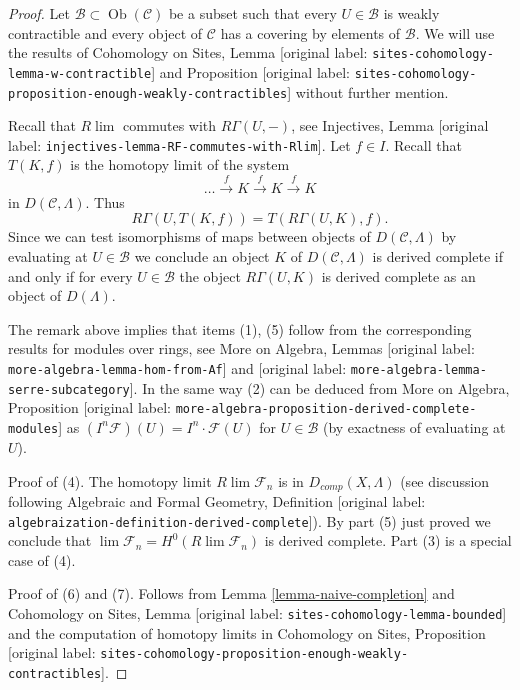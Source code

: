 \documentclass[10pt,a4paper]{article}
\theoremstyle{plain}
\theoremstyle{definition}
\theoremstyle{remark}
\numberwithin{equation}{subsection}
\def\lim{\mathop{\mathrm{lim}}\nolimits}
\def\Ob{\mathop{\mathrm{Ob}}\nolimits}
\begin{document}
\begin{proof}
Let $\mathcal{B} \subset \Ob(\mathcal{C})$ be a subset such that every
$U \in \mathcal{B}$ is weakly contractible and every object of $\mathcal{C}$
has a covering by elements of $\mathcal{B}$.
We will use the results of Cohomology on Sites,
Lemma \textnormal{[original label: \nolinkurl{sites-cohomology-lemma-w-contractible}]} and
Proposition \textnormal{[original label: \nolinkurl{sites-cohomology-proposition-enough-weakly-contractibles}]}
without further mention.

\medskip\noindent
Recall that $R\lim$ commutes with $R\Gamma(U, -)$,
see Injectives, Lemma \textnormal{[original label: \nolinkurl{injectives-lemma-RF-commutes-with-Rlim}]}.
Let $f \in I$. Recall that $T(K, f)$ is the homotopy limit
of the system
$$
\ldots \xrightarrow{f} K \xrightarrow{f} K \xrightarrow{f} K
$$
in $D(\mathcal{C}, \Lambda)$. Thus
$$
R\Gamma(U, T(K, f)) = T(R\Gamma(U, K), f).
$$
Since we can test isomorphisms of maps between objects of
$D(\mathcal{C}, \Lambda)$ by evaluating at $U \in \mathcal{B}$
we conclude an object $K$ of $D(\mathcal{C}, \Lambda)$
is derived complete if and only if for every $U \in \mathcal{B}$ the
object $R\Gamma(U, K)$ is derived complete as an object of $D(\Lambda)$.

\medskip\noindent
The remark above implies that items (1), (5) follow from the corresponding
results for modules over rings, see
More on Algebra, Lemmas \textnormal{[original label: \nolinkurl{more-algebra-lemma-hom-from-Af}]} and
\textnormal{[original label: \nolinkurl{more-algebra-lemma-serre-subcategory}]}.
In the same way (2) can be deduced from
More on Algebra, Proposition
\textnormal{[original label: \nolinkurl{more-algebra-proposition-derived-complete-modules}]}
as $(I^n\mathcal{F})(U) = I^n \cdot \mathcal{F}(U)$
for $U \in \mathcal{B}$ (by exactness of evaluating at $U$).

\medskip\noindent
Proof of (4). The homotopy limit $R\lim \mathcal{F}_n$ is in
$D_{comp}(X, \Lambda)$ (see discussion following
Algebraic and Formal Geometry, Definition
\textnormal{[original label: \nolinkurl{algebraization-definition-derived-complete}]}).
By part (5) just proved we conclude that
$\lim \mathcal{F}_n = H^0(R\lim \mathcal{F}_n)$
is derived complete.
Part (3) is a special case of (4).

\medskip\noindent
Proof of (6) and (7). Follows from
Lemma \ref{lemma-naive-completion}
and
Cohomology on Sites, Lemma \textnormal{[original label: \nolinkurl{sites-cohomology-lemma-bounded}]}
and the computation of homotopy limits in Cohomology on Sites,
Proposition \textnormal{[original label: \nolinkurl{sites-cohomology-proposition-enough-weakly-contractibles}]}.
\end{proof}
\end{document}
